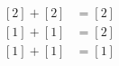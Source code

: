 \documentclass[preview]{standalone}
\begin{document}
\begin{align*}
\begin{aligned}\left[2\right] + \left[2\right] &= \left[2\right] \\\left[1\right] + \left[1\right] &= \left[2\right] \\\left[1\right] + \left[1\right] &= \left[1\right]\end{aligned}
\end{align*}
\end{document}
